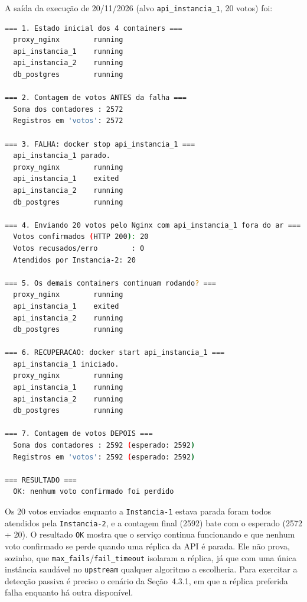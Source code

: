 \documentclass[12pt,a4paper]{article}
\begin{document}
A saída da execução de 20/11/2026 (alvo \texttt{api\_instancia\_1}, 20 votos) foi:
\begin{lstlisting}[language=bash, caption={Saída de \texttt{scripts/demo\_falha\_container.sh} com \texttt{api\_instancia\_1} fora do ar, obtida em 20/11/2026}]
=== 1. Estado inicial dos 4 containers ===
  proxy_nginx        running
  api_instancia_1    running
  api_instancia_2    running
  db_postgres        running

=== 2. Contagem de votos ANTES da falha ===
  Soma dos contadores : 2572
  Registros em 'votos': 2572

=== 3. FALHA: docker stop api_instancia_1 ===
  api_instancia_1 parado.
  proxy_nginx        running
  api_instancia_1    exited
  api_instancia_2    running
  db_postgres        running

=== 4. Enviando 20 votos pelo Nginx com api_instancia_1 fora do ar ===
  Votos confirmados (HTTP 200): 20
  Votos recusados/erro        : 0
  Atendidos por Instancia-2: 20

=== 5. Os demais containers continuam rodando? ===
  proxy_nginx        running
  api_instancia_1    exited
  api_instancia_2    running
  db_postgres        running

=== 6. RECUPERACAO: docker start api_instancia_1 ===
  api_instancia_1 iniciado.
  proxy_nginx        running
  api_instancia_1    running
  api_instancia_2    running
  db_postgres        running

=== 7. Contagem de votos DEPOIS ===
  Soma dos contadores : 2592 (esperado: 2592)
  Registros em 'votos': 2592 (esperado: 2592)

=== RESULTADO ===
  OK: nenhum voto confirmado foi perdido
\end{lstlisting}

Os 20 votos enviados enquanto a \texttt{Instancia-1} estava parada foram todos atendidos pela \texttt{Instancia-2}, e a contagem final (2592) bate com o esperado (2572 + 20). O resultado \texttt{OK} mostra que o serviço continua funcionando e que nenhum voto confirmado se perde quando uma réplica da API é parada. Ele não prova, sozinho, que \texttt{max\_fails}/\texttt{fail\_timeout} isolaram a réplica, já que com uma única instância saudável no \texttt{upstream} qualquer algoritmo a escolheria. Para exercitar a detecção passiva é preciso o cenário da Seção~4.3.1, em que a réplica preferida falha enquanto há outra disponível.
\end{document}
